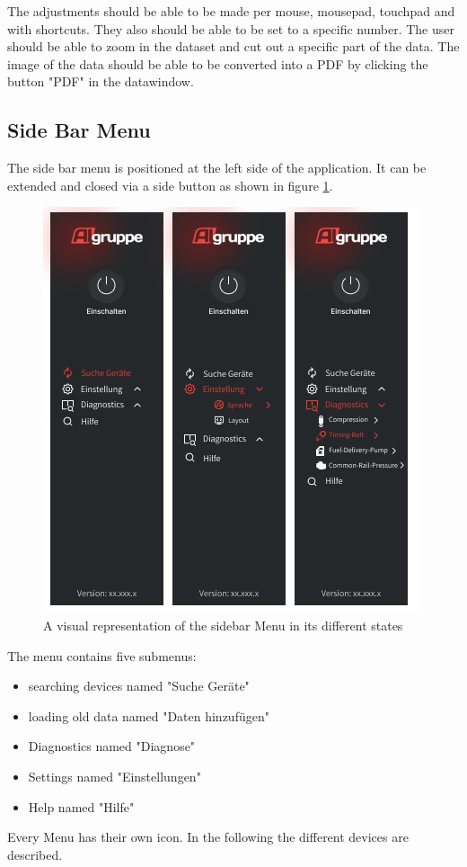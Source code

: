 \documentclass{scrreprt}
\begin{document}
The adjustments should be able to be made per mouse, mousepad, touchpad and with shortcuts. They also should be able to be set to a specific number. 
The user should be able to zoom in the dataset and cut out a specific part of the data. The image of the data should be able to be converted into a PDF by clicking the button "PDF" in the datawindow. 


\subsection{Side Bar Menu}

The side bar menu is positioned at the left side of the application. It can be extended and closed via a side button as shown in figure \ref{fig: sidebarMenu}. 
\begin{figure}
    \includegraphics[width=.9\textwidth]{assets/pictures/SideBarMenu.png}
    \caption[]{A visual representation of the sidebar Menu in its different states}
    \label{fig: sidebarMenu}
\end{figure}
The menu contains five submenus:
\begin{itemize}
        \item searching devices named "Suche Geräte"
        \item loading old data named "Daten hinzufügen"
        \item Diagnostics named "Diagnose"
        \item Settings named "Einstellungen"
        \item Help named "Hilfe"
    \end{itemize}
Every Menu has their own icon. 
In the following the different devices are described.
\end{document}

